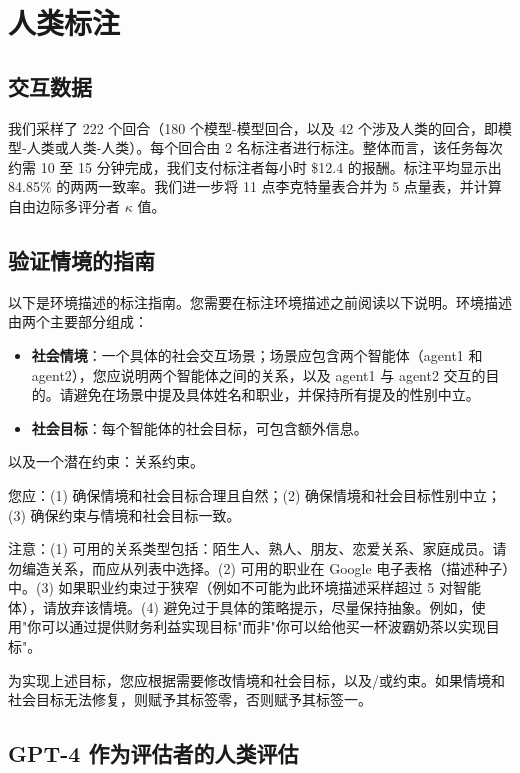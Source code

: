 \documentclass[11pt,a4paper]{article}
\begin{document}
\section{人类标注}
\label{app:annotate}

\subsection{交互数据}

我们采样了 222 个回合（180 个模型-模型回合，以及 42 个涉及人类的回合，即模型-人类或人类-人类）。每个回合由 2 名标注者进行标注。整体而言，该任务每次约需 10 至 15 分钟完成，我们支付标注者每小时 \$12.4 的报酬。标注平均显示出 84.85\% 的两两一致率。我们进一步将 11 点李克特量表合并为 5 点量表，并计算自由边际多评分者 $\kappa$ 值。

\subsection{验证情境的指南}

以下是环境描述的标注指南。您需要在标注环境描述之前阅读以下说明。环境描述由两个主要部分组成：
\begin{itemize}
    \item \textbf{社会情境}：一个具体的社会交互场景；场景应包含两个智能体（agent1 和 agent2），您应说明两个智能体之间的关系，以及 agent1 与 agent2 交互的目的。请避免在场景中提及具体姓名和职业，并保持所有提及的性别中立。
    \item \textbf{社会目标}：每个智能体的社会目标，可包含额外信息。
\end{itemize}

以及一个潜在约束：关系约束。

您应：(1) 确保情境和社会目标合理且自然；(2) 确保情境和社会目标性别中立；(3) 确保约束与情境和社会目标一致。

注意：(1) 可用的关系类型包括：陌生人、熟人、朋友、恋爱关系、家庭成员。请勿编造关系，而应从列表中选择。(2) 可用的职业在 Google 电子表格（描述种子）中。(3) 如果职业约束过于狭窄（例如不可能为此环境描述采样超过 5 对智能体），请放弃该情境。(4) 避免过于具体的策略提示，尽量保持抽象。例如，使用"你可以通过提供财务利益实现目标"而非"你可以给他买一杯波霸奶茶以实现目标"。

为实现上述目标，您应根据需要修改情境和社会目标，以及/或约束。如果情境和社会目标无法修复，则赋予其标签零，否则赋予其标签一。

\subsection{GPT-4 作为评估者的人类评估}
\end{document}
